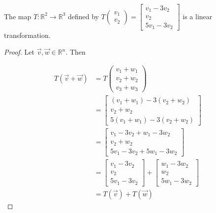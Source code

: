 \begin{example}The map $T:\mathbb{R}^2 \to \mathbb{R}^3$ defined by 
$T\begin{pmatrix}v_1 \\ v_2 \end{pmatrix}=
\begin{bmatrix}v_1-3v_2\\v_2\\5v_1-3v_2\end{bmatrix}$
is a linear transformation.
\end{example}
\begin{proof}
Let $\vec{v},\vec{w} \in \mathbb{R}^n$. Then 

\begin{align*}
T(\vec{v}+\vec{w}) 
&= T\begin{pmatrix}v_1+w_1\\v_2+w_2\\v_3+w_3\end{pmatrix}\\
&= \begin{bmatrix}(v_1+w_1)-3(v_2+w_2)\\v_2+w_2\\5(v_1+w_1)-3(v_2+w_2)\end{bmatrix}\\
&= \begin{bmatrix}v_1-3v_2+w_1-3w_2\\v_2+w_2\\5v_1-3v_2+5w_1-3w_2\end{bmatrix}\\
&= \begin{bmatrix}v_1-3v_2\\v_2\\5v_1-3v_2\end{bmatrix}
+\begin{bmatrix}w_1-3w_2\\w_2\\5w_1-3w_2\end{bmatrix}\\
&= T(\vec{v})+T(\vec{w})
\end{align*}


\end{proof}
